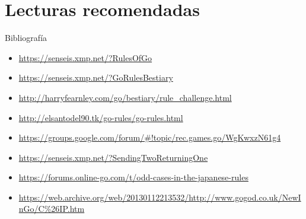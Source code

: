 \documentclass{beamer}
\begin{document}
\section{Lecturas recomendadas}

\begin{frame}{Bibliografía}

    \begin{itemize}
        \item \url{https://senseis.xmp.net/?RulesOfGo}
        \item \url{https://senseis.xmp.net/?GoRulesBestiary}
        \item \url{http://harryfearnley.com/go/bestiary/rule_challenge.html}
        \item \url{http://elsantodel90.tk/go-rules/go-rules.html}
        \item \url{https://groups.google.com/forum/\#!topic/rec.games.go/WgKwxzN61g4}
        \item \url{https://senseis.xmp.net/?SendingTwoReturningOne}
        \item \url{https://forums.online-go.com/t/odd-cases-in-the-japanese-rules}
        \item \url{https://web.archive.org/web/20130112213532/http://www.gogod.co.uk/NewInGo/C\%26IP.htm}
    \end{itemize}

\end{frame}
\end{document}

